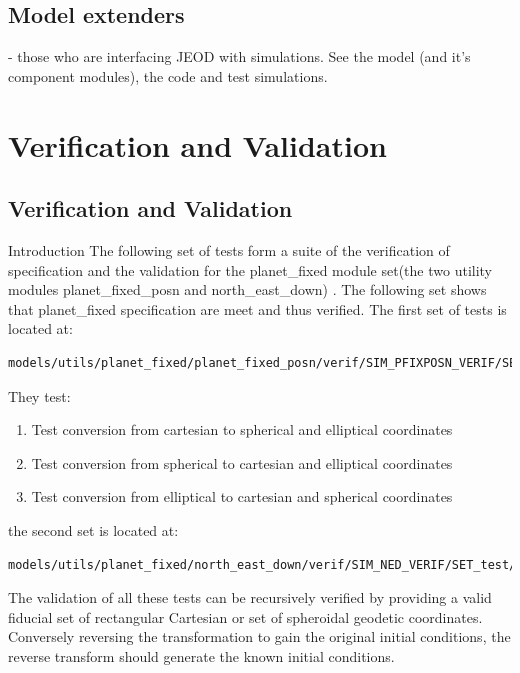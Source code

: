 \documentclass[twoside,11pt,titlepage]{report}
\begin{document}
\section{ Model extenders} - those who are interfacing JEOD with simulations.
See the model (and it's component modules), the code and test simulations.

\chapter{Verification and Validation}\label{ch:ivv}

\section{Verification and Validation}
Introduction \newline
The following set of tests form a suite of the verification of specification
and the validation for the planet\_fixed module set(the two utility modules planet\_fixed\_posn and north\_east\_down) . The following set shows that
planet\_fixed specification are meet and thus verified.
The first set of tests is located at:
\begin{verbatim}
models/utils/planet_fixed/planet_fixed_posn/verif/SIM_PFIXPOSN_VERIF/SET_test/RUN_pfixposn_test
\end{verbatim}
They test:
\begin{enumerate}
\item Test conversion from cartesian to spherical and elliptical coordinates
\item Test conversion from spherical to cartesian and elliptical coordinates
\item Test conversion from elliptical to cartesian and spherical coordinates
\end{enumerate}

the second set is located at:
\begin{verbatim}
models/utils/planet_fixed/north_east_down/verif/SIM_NED_VERIF/SET_test/RUN_nedtest
\end{verbatim}

The validation of all these tests can be recursively verified by providing a valid fiducial set of
rectangular Cartesian or set of spheroidal geodetic coordinates. Conversely reversing the transformation to gain
the original initial conditions, the reverse transform should generate the known initial conditions.
\end{document}
